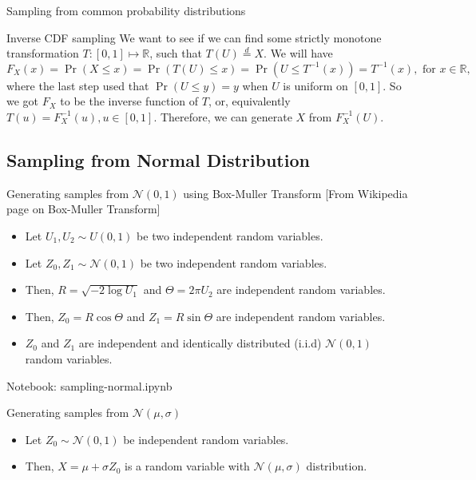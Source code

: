 \documentclass{beamer}
\begin{document}
\begin{section}{Sampling from common probability distributions}
\begin{frame}{Inverse CDF sampling}
We want to see if we can find some strictly monotone transformation $T:[0,1] \mapsto \mathbb{R}$, such that $T(U) \stackrel{d}{=} X$. We will have
$$
F_X(x)=\operatorname{Pr}(X \leq x)=\operatorname{Pr}(T(U) \leq x)=\operatorname{Pr}\left(U \leq T^{-1}(x)\right)=T^{-1}(x), \text { for } x \in \mathbb{R},
$$
where the last step used that $\operatorname{Pr}(U \leq y)=y$ when $U$ is uniform on $[0,1]$.
So we got $F_X$ to be the inverse function of $T$, or, equivalently $T(u)=F_X^{-1}(u), u \in[0,1]$. Therefore, we can generate $X$ from $F_X^{-1}(U)$.
\end{frame}

\subsection{Sampling from Normal Distribution}
\begin{frame}{Generating samples from $\mathcal{N}(0, 1)$ using Box-Muller Transform}
    [From Wikipedia page on Box-Muller Transform]
    \begin{itemize}
        \item Let $U_1, U_2 \sim U(0, 1)$ be two independent random variables.
        \item \pause Let $Z_0, Z_1 \sim \mathcal{N}(0, 1)$ be two independent random variables.
        \item \pause Then, $R = \sqrt{-2 \log U_1}$ and $\Theta = 2 \pi U_2$ are independent random variables.
        \item \pause Then, $Z_0 = R \cos \Theta$ and $Z_1 = R \sin \Theta$ are independent random variables.
        \item \pause $Z_0$ and $Z_1$ are independent and identically distributed (i.i.d) $\mathcal{N}(0, 1)$ random variables.
    \end{itemize}
    
\end{frame}

\begin{frame}
    Notebook: sampling-normal.ipynb
\end{frame}

\begin{frame}{Generating samples from $\mathcal{N}(\mu, \sigma)$}
    \begin{itemize}
        \item Let $Z_0 \sim \mathcal{N}(0, 1)$ be independent random variables.
        \item \pause Then, $X = \mu + \sigma Z_0$ is a random variable with $\mathcal{N}(\mu, \sigma)$ distribution.
    \end{itemize}
    
\end{frame}
    
\end{section}
\end{document}
